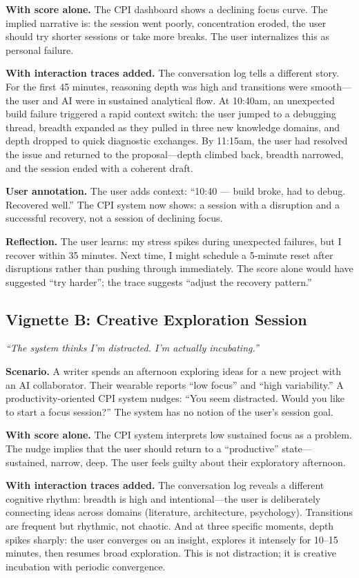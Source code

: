 \documentclass[10pt]{article}
\begin{document}
\textbf{With score alone.} The CPI dashboard shows a declining focus curve. The implied narrative is: the session went poorly, concentration eroded, the user should try shorter sessions or take more breaks. The user internalizes this as personal failure.

\textbf{With interaction traces added.} The conversation log tells a different story. For the first 45 minutes, reasoning depth was high and transitions were smooth---the user and AI were in sustained analytical flow. At 10:40am, an unexpected build failure triggered a rapid context switch: the user jumped to a debugging thread, breadth expanded as they pulled in three new knowledge domains, and depth dropped to quick diagnostic exchanges. By 11:15am, the user had resolved the issue and returned to the proposal---depth climbed back, breadth narrowed, and the session ended with a coherent draft.

\textbf{User annotation.} The user adds context: ``10:40 --- build broke, had to debug. Recovered well.'' The CPI system now shows: a session with a disruption and a successful recovery, not a session of declining focus.

\textbf{Reflection.} The user learns: my stress spikes during unexpected failures, but I recover within 35 minutes. Next time, I might schedule a 5-minute reset after disruptions rather than pushing through immediately. The score alone would have suggested ``try harder''; the trace suggests ``adjust the recovery pattern.''

\subsection{Vignette B: Creative Exploration Session}

\textit{``The system thinks I'm distracted. I'm actually incubating.''}

\textbf{Scenario.} A writer spends an afternoon exploring ideas for a new project with an AI collaborator. Their wearable reports ``low focus'' and ``high variability.'' A productivity-oriented CPI system nudges: ``You seem distracted. Would you like to start a focus session?'' The system has no notion of the user's session goal.

\textbf{With score alone.} The CPI system interprets low sustained focus as a problem. The nudge implies that the user should return to a ``productive'' state---sustained, narrow, deep. The user feels guilty about their exploratory afternoon.

\textbf{With interaction traces added.} The conversation log reveals a different cognitive rhythm: breadth is high and intentional---the user is deliberately connecting ideas across domains (literature, architecture, psychology). Transitions are frequent but rhythmic, not chaotic. And at three specific moments, depth spikes sharply: the user converges on an insight, explores it intensely for 10--15 minutes, then resumes broad exploration. This is not distraction; it is creative incubation with periodic convergence.
\end{document}
